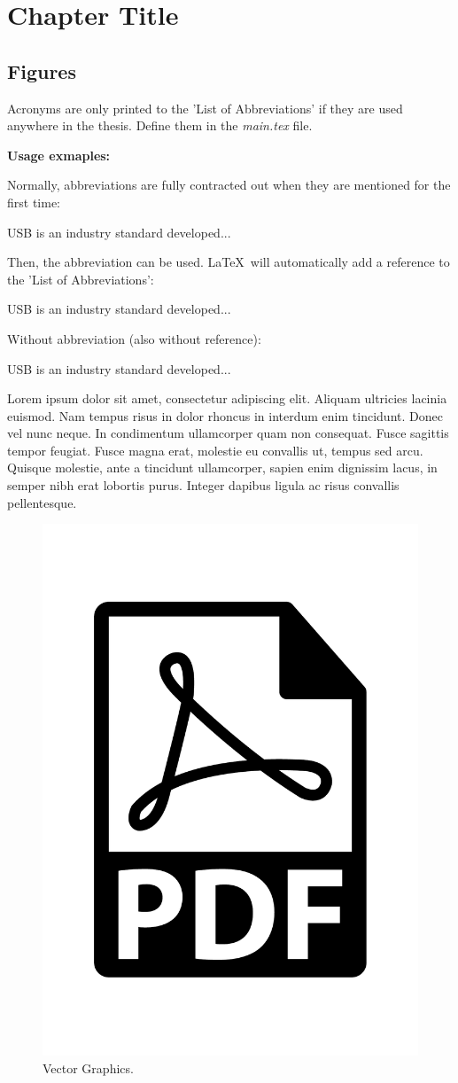 
\chapter{Chapter Title} %

\label{ChapterX} %


\section{Figures}

Acronyms are only printed to the 'List of Abbreviations' if they are used anywhere in the thesis. Define them in the \textit{main.tex} file.

\textbf{Usage exmaples:}

Normally, abbreviations are fully contracted out when they are mentioned for the first time:

\ac{USB} is an industry standard developed...

Then, the abbreviation can be used. \LaTeX~will automatically add a reference to the 'List of Abbreviations':

\acs{USB} is an industry standard developed...

Without abbreviation (also without reference):

\acl{USB} is an industry standard developed...

\vspace{1em}

Lorem ipsum dolor sit amet, consectetur adipiscing elit. Aliquam ultricies lacinia euismod. Nam tempus risus in dolor rhoncus in interdum enim tincidunt. Donec vel nunc neque. In condimentum ullamcorper quam non consequat. Fusce sagittis tempor feugiat. Fusce magna erat, molestie eu convallis ut, tempus sed arcu. Quisque molestie, ante a tincidunt ullamcorper, sapien enim dignissim lacus, in semper nibh erat lobortis purus. Integer dapibus ligula ac risus convallis pellentesque.

\begin{figure}[H]
\centering
\includegraphics[width=.3\linewidth]{figures/chapter1/pdf}
\caption[Vector Graphics.]{Vector Graphics.}
\label{fig:pdf}
\end{figure}

